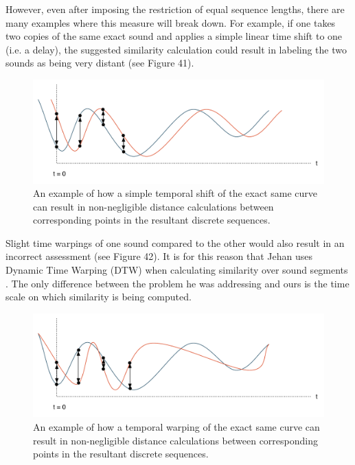 \documentclass[12pt]{report} 	%
\numberwithin{figure}{chapter}
\numberwithin{table}{chapter}
\numberwithin{equation}{chapter}
\begin{document}
\begin{flushleft}
However, even after imposing the restriction of equal sequence lengths, there are many examples where this measure will break down. For example, if one takes two copies of the same exact sound and applies a simple linear time shift to one (i.e. a delay), the suggested similarity calculation could result in labeling the two sounds as being very distant (see Figure 41).
\begin{figure}[h!]
\vspace{24pt}
\begin{center}
\includegraphics[scale=0.6]{TimbreDistance3}
\caption[Timbre distance between time-shifted curves]{An example of how a simple temporal shift of the exact same curve can result in non-negligible distance calculations between corresponding points in the resultant discrete sequences.}
\end{center}
\vspace{6pt}
\end{figure}

Slight time warpings of one sound compared to the other would also result in an incorrect assessment (see Figure 42). It is for this reason that Jehan uses Dynamic Time Warping (DTW) when calculating similarity over sound segments \cite{Jehan:2005fy}. The only difference between the problem he was addressing and ours is the time scale on which similarity is being computed.
\begin{figure}[h!]
\begin{center}
\includegraphics[scale=0.6]{TimbreDistance4}
\caption[Timbre distance between time-warped curves]{An example of how a temporal warping of the exact same curve can result in non-negligible distance calculations between corresponding points in the resultant discrete sequences.}
\end{center}
\vspace{6pt}
\end{figure}


\end{flushleft}
\end{document}
